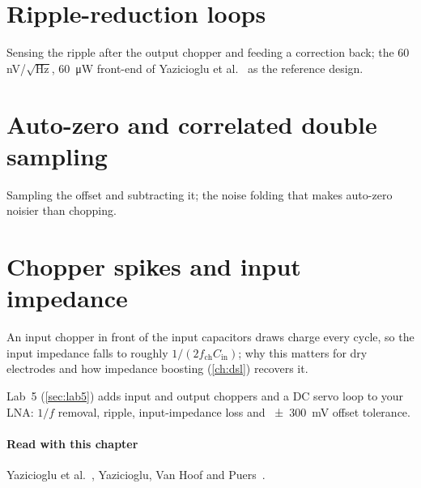 \section{Ripple-reduction loops}\label{sec:ch9-3}
Sensing the ripple after the output chopper and feeding a correction back; the 60\,nV/$\sqrt{\mathrm{Hz}}$, \qty{60}{\micro\watt} front-end of Yazicioglu et al.~\cite{yazicioglu2007} as the reference design.

\section{Auto-zero and correlated double sampling}\label{sec:ch9-4}
Sampling the offset and subtracting it; the noise folding that makes auto-zero noisier than chopping.

\section{Chopper spikes and input impedance}\label{sec:ch9-5}
An input chopper in front of the input capacitors draws charge every cycle, so the input impedance falls to roughly $1/(2 f_\mathrm{ch} C_\mathrm{in})$; why this matters for dry electrodes and how impedance boosting (\cref{ch:dsl}) recovers it.

\begin{tryit}
Lab~5 (\cref{sec:lab5}) adds input and output choppers and a DC servo loop to your LNA: $1/f$ removal, ripple, input-impedance loss and \qty{\pm 300}{\milli\volt} offset tolerance.
\end{tryit}

\paragraph{Read with this chapter} Yazicioglu et al.~\cite{yazicioglu2007}, Yazicioglu, Van Hoof and Puers~\cite{yazicioglubook}.
